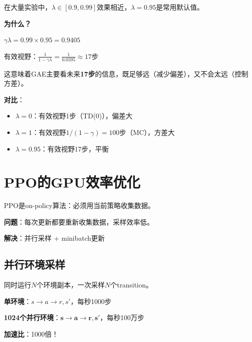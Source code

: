 \documentclass[11pt,a4paper]{article}
\theoremstyle{definition}
\begin{document}
\begin{surprising}[$\lambda = 0.95$几乎总是最优]
在大量实验中，$\lambda \in [0.9, 0.99]$效果相近，$\lambda = 0.95$是常用默认值。

\textbf{为什么？}

$\gamma\lambda = 0.99 \times 0.95 = 0.9405$

有效视野：$\frac{1}{1-\gamma\lambda} = \frac{1}{0.0595} \approx 17$步

这意味着GAE主要看未来\textbf{17步}的信息，既足够远（减少偏差），又不会太远（控制方差）。

\textbf{对比}：
\begin{itemize}
    \item $\lambda = 0$：有效视野1步（TD(0)），偏差大
    \item $\lambda = 1$：有效视野$1/(1-\gamma) = 100$步（MC），方差大
    \item $\lambda = 0.95$：有效视野17步，平衡
\end{itemize}
\end{surprising}

\section{PPO的GPU效率优化}

\begin{plainwords}[PPO的计算瓶颈]
PPO是on-policy算法：必须用当前策略收集数据。

\textbf{问题}：每次更新都要重新收集数据，采样效率低。

\textbf{解决}：并行采样 + minibatch更新
\end{plainwords}

\subsection{并行环境采样}

\begin{keypoint}[向量化环境]
同时运行$N$个环境副本，一次采样$N$个transition。

\textbf{单环境}：$s \to a \to r, s'$，每秒1000步

\textbf{1024个并行环境}：$\mathbf{s} \to \mathbf{a} \to \mathbf{r}, \mathbf{s}'$，每秒100万步

\textbf{加速比}：1000倍！
\end{keypoint}
\end{document}

